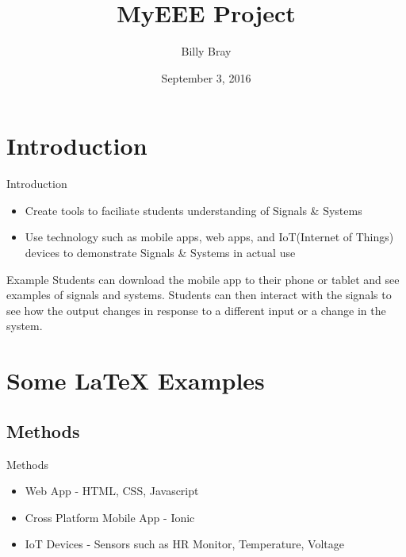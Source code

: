 \documentclass{beamer}
\title[Your Short Title]{MyEEE Project}
\author{Billy Bray}
\institute{University of Tennessee at Chattanooga}
\date{September 3, 2016}
\begin{document}
\begin{frame}
  \titlepage
\end{frame}


\section{Introduction}

\begin{frame}{Introduction}

\begin{itemize}
  \item Create tools to faciliate students understanding of Signals \& Systems
  \item Use technology such as mobile apps, web apps, and IoT(Internet of Things) devices to demonstrate Signals \& Systems  in actual use
\end{itemize}

\vskip 1cm

\begin{block}{Example}
Students can download the mobile app to their phone or tablet and see examples of signals and systems. Students can then interact with the signals to see how the output changes in response to a different input or a change in the system.
\end{block}

\end{frame}

\section{Some \LaTeX{} Examples}
\subsection{Methods}

\begin{frame}{Methods}

\begin{itemize}
\item Web App - HTML, CSS, Javascript
\item Cross Platform Mobile App - Ionic
\item IoT Devices - Sensors such as HR Monitor, Temperature, Voltage
\end{itemize}




\end{frame}
\end{document}

